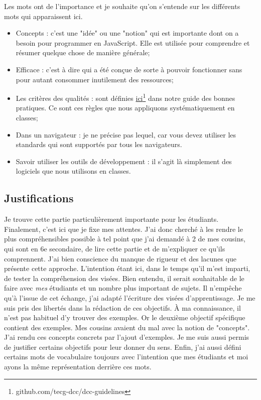 Les mots ont de l'importance et je souhaite qu'on s'entende sur les différents mots qui apparaissent ici.

\begin{itemize}
    \item Concepts : c'est une "idée" ou une "notion" qui est importante dont on a besoin pour programmer en JavaScript. Elle est utilisée pour comprendre et résumer quelque chose de manière générale;
    \item Efficace : c'est à dire qui a été conçue de sorte à pouvoir fonctionner sans pour autant consommer inutilement des ressources;
    \item Les critères des qualités : sont définies \href{https://github.com/tecg-dcc/dcc-guidelines}{ici}\footnote{github.com/tecg-dcc/dcc-guidelines} dans notre guide des bonnes pratiques. Ce sont ces règles que nous appliquons systématiquement en classes;
    \item Dans un navigateur : je ne précise pas lequel, car vous devez utiliser les standards qui sont supportés par tous les navigateurs.
    \item Savoir utiliser les outils de développement : il s'agit là simplement des logiciels que nous utilisons en classes.
\end{itemize}


\subsection{Justifications}

Je trouve cette partie particulièrement importante pour les étudiants. Finalement, c'est ici que je fixe mes attentes. J'ai donc cherché à les rendre le plus compréhensibles possible à tel point que j'ai demandé à 2 de mes cousins, qui sont en 6e secondaire, de lire cette partie et de m’expliquer ce qu’ils comprennent. J'ai bien conscience du manque de rigueur et des lacunes que présente cette approche. L'intention étant ici, dans le temps qu'il m'est imparti, de tester la compréhension des visées. Bien entendu, il serait souhaitable de le faire avec \emph{mes} étudiants et un nombre plus important de sujets. Il n'empêche qu'à l’issue de cet échange, j'ai adapté l'écriture des visées d'apprentissage. Je me suis pris des libertés dans la rédaction de ces objectifs. À ma connaissance, il n'est pas habituel d’y trouver des exemples. Or le deuxième objectif spécifique contient des exemples. Mes cousins avaient du mal avec la notion de "concepts". J’ai rendu ces concepts concrets par l’ajout d’exemples. Je me suis aussi permis de justifier certains objectifs pour leur donner du sens. Enfin, j'ai aussi défini certains mots de vocabulaire toujours avec l'intention que mes étudiants et moi ayons la même représentation derrière ces mots.\\

